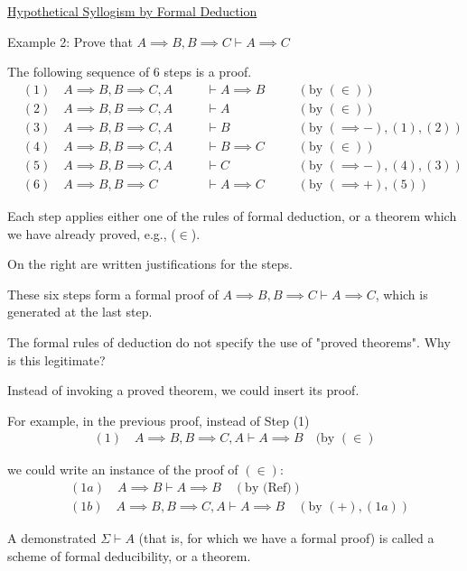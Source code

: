 \documentclass{article}
\begin{document}
\underline{Hypothetical Syllogism by Formal Deduction}

Example 2: Prove that $A \implies B, B \implies C \vdash A \implies C$

The following sequence of 6 steps is a proof.
\begin{align*}
&(1) \quad A \implies B, B \implies C, A \quad &&\vdash A \implies B \quad &&(\text{by } (\in)) \\
&(2) \quad A \implies B, B \implies C, A \quad &&\vdash A \quad &&(\text{by } (\in )) \\
&(3) \quad A \implies B, B \implies C, A \quad &&\vdash B \quad &&(\text{by } (\implies -),(1),(2)) \\
&(4) \quad A \implies B, B \implies C, A \quad &&\vdash B \implies C \quad &&(\text{by } (\in)) \\
&(5) \quad A \implies B, B \implies C, A \quad &&\vdash C \quad &&(\text{by } (\implies -),(4),(3)) \\
&(6) \quad A \implies B, B \implies C \quad &&\vdash A \implies C \quad &&(\text{by } (\implies +),(5))
\end{align*}

Each step applies either one of the rules of formal deduction, or a theorem which we have already proved, e.g., ($\in$).

On the right are written justifications for the steps.

These six steps form a formal proof of $A\implies B, B \implies C \vdash A \implies C$, which is generated at the last step.

The formal rules of deduction do not specify the use of "proved theorems". Why is this legitimate? 

Instead of invoking a proved theorem, we could insert its proof. 

For example, in the previous proof, instead of Step (1)
\begin{align*}
(1) \quad A \implies B, B \implies C, A \vdash A \implies B \quad \text{(by $(\in)$}
\end{align*}

we could write an instance of the proof of $(\in)$:
\begin{align*}
&(1a)\quad  A \implies B \vdash A \implies B \quad (\text{by (Ref)}) \\
&(1b)\quad  A \implies B, B \implies C, A \vdash A \implies B \quad (\text{by } (+),(1a))
\end{align*}

A demonstrated $\Sigma \vdash A$ (that is, for which we have a formal proof) is called a scheme of formal deducibility, or a theorem. 
\end{document}
